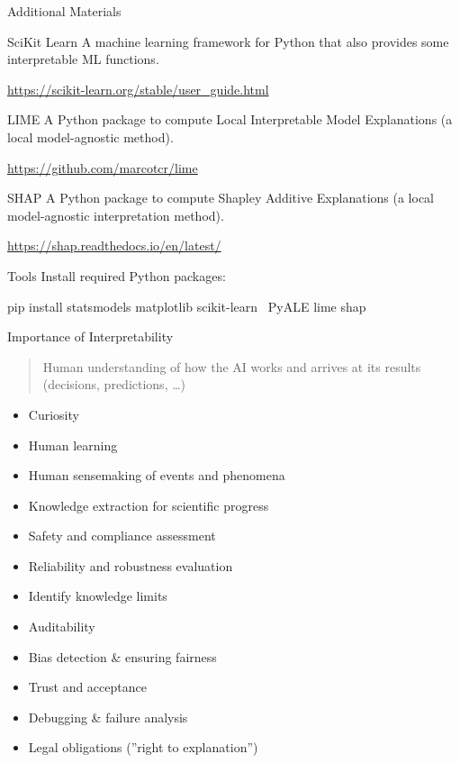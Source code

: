 \documentclass[ignorenonframetext,xcolor=x11names]{beamer}
\begin{document}
\begin{frame}[label=full]{Additional Materials}
\small
\begin{block}{SciKit Learn}
A machine learning framework for Python that also provides some interpretable ML functions.

\url{https://scikit-learn.org/stable/user_guide.html}
\end{block}

\begin{block}{LIME}
A Python package to compute Local Interpretable Model Explanations (a local model-agnostic method).

\url{https://github.com/marcotcr/lime}
\end{block}
\begin{block}{SHAP}
A Python package to compute Shapley Additive Explanations (a local model-agnostic interpretation method).

\url{https://shap.readthedocs.io/en/latest/}
\end{block}
\end{frame}

\begin{frame}[label=withcode,fragile]{Tools}
Install required Python packages:
\begin{bashcode}
pip install statsmodels matplotlib scikit-learn \
    PyALE lime shap
\end{bashcode}
\end{frame}


\begin{frame}[label=full]{Importance of Interpretability}

\begin{quote} \large
Human understanding of how the AI works and arrives at its results (decisions, predictions, \ldots)
\end{quote}

\footnotesize
\begin{itemize}
\item Curiosity
\item Human learning
\item Human sensemaking of events and phenomena
\item Knowledge extraction for scientific progress
\item Safety and compliance assessment
\item Reliability and robustness evaluation
\item Identify knowledge limits
\item Auditability
\item Bias detection \& ensuring fairness
\item Trust and acceptance
\item Debugging \& failure analysis
\item Legal obligations (''right to explanation'')
\end{itemize}
\end{frame}
\end{document}
